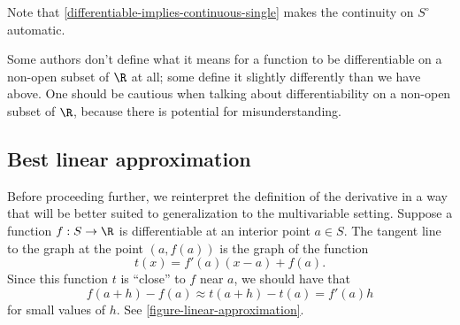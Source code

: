 Note that \cref{differentiable-implies-continuous-single} makes the continuity on $S^\circ$ automatic. 

\begin{caution}
	Some authors don't define what it means for a function to be differentiable on a non-open subset of $\R$ at all; some define it slightly differently than we have above. One should be cautious when talking about differentiability on a non-open subset of $\R$, because there is potential for misunderstanding. 
\end{caution}

\subsection{Best linear approximation}

Before proceeding further, we reinterpret the definition of the derivative in a way that will be better suited to generalization to the multivariable setting. Suppose a function $f : S \to \R$ is differentiable at an interior point $a \in S$. The tangent line to the graph at the point $(a, f(a))$ is the graph of the function
\[ t(x) = f'(a)(x-a) + f(a). \]
Since this function $t$ is ``close'' to $f$ near $a$, we should have that
\[ f(a+h)-f(a) \approx t(a+h) - t(a) = f'(a)h \]
for small values of $h$. See \cref{figure-linear-approximation}. 


